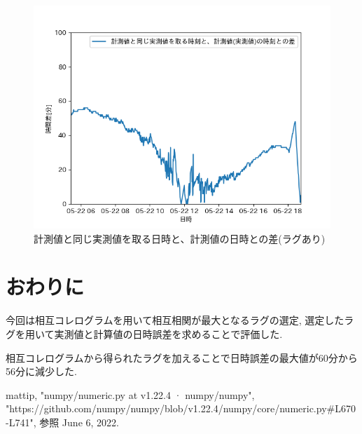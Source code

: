 \documentclass[a4j,12pt,]{jarticle}
\begin{document}
\begin{figure}[H]
  \begin{center}
    \includegraphics[width=160mm]{dt_diff_with_delay.png}
    \caption{計測値と同じ実測値を取る日時と、計測値の日時との差(ラグあり)}
    \label{p3}
  \end{center}
\end{figure}

\section{おわりに}
今回は相互コレログラムを用いて相互相関が最大となるラグの選定, 選定したラグを用いて実測値と計算値の日時誤差を求めることで評価した.

相互コレログラムから得られたラグを加えることで日時誤差の最大値が60分から56分に減少した.

\begin{thebibliography}{5}
  mattip, "numpy/numeric.py at v1.22.4 · numpy/numpy",\\ "https://github.com/numpy/numpy/blob/v1.22.4/numpy/core/numeric.py\#L670-L741", 参照 June 6, 2022.
\end{thebibliography}
\end{document}

